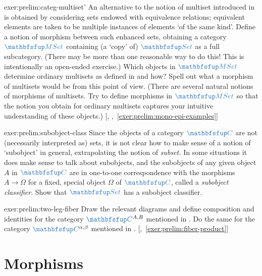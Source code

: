 \begin{exer}{}{exer:prelim:categ-multiset'}
  \exerused{} An alternative to the notion of multiset introduced in
   is obtained
  by considering sets endowed with equivalence relations; equivalent
  elements are taken to be multiple instances of elements `of the same
  kind'.  Define a notion of morphism between such enhanced sets,
  obtaining a category $\categ{MSet}$ containing (a `copy' of)
  $\categ{Set}$ as a full subcategory.  (There may be more than one
  reasonable way to do this! This is intentionally an open-ended
  exercise.) Which objects in $\categ{MSet}$ determine ordinary
  multisets as defined in
   and how?
  Spell out what a morphism of multisets would be from this point of
  view. (There are several natural notions of morphisms of
  multisets. Try to define morphisms in $\categ{MSet}$ so that the
  notion you obtain for ordinary multisets captures your intuitive
  understanding of these objects.)
  [,
  ,~\ref{exer:prelim:mono-epi-examples}]
\end{exer}

\begin{exer}{}{exer:prelim:subobject-class}
  Since the objects of a category $\categ{C}$ are not (necessarily
  interpreted as) sets, it is not clear how to make sense of a notion
  of `subobject' in general, extrapolating the notion of
  \emph{subset.} In some situations it does make sense to
  talk about subobjects, and the subobjects of any given object $A$ in
  $\categ{C}$ are in one-to-one correspondence with the morphisms
  $A \to \Omega$ for a fixed, special object $\Omega$ of $\categ{C}$,
  called a \emph{subobject classifier}. Show that $\categ{Set}$ has a
  subobject classifier.
\end{exer}

\begin{exer}{}{exer:prelim:two-leg-fiber}
  \exerused{} Draw the relevant diagrams and define composition and
  identities for the category $\categ{C}^{A,B}$ mentioned in
  . Do the same for the category
  $\categ{C}^{\alpha,\beta}$ mentioned in
  .
  [,~\ref{exer:prelim:fiber-product}]
\end{exer}

\section{Morphisms}%
\label{sec:prelims:morphisms}

